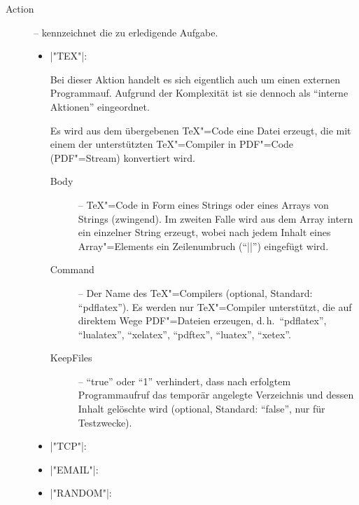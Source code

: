 \documentclass[%
fontsize=11pt
,paper=a4
,twoside
,headings=normal
,numbers=endperiod
,pagesize
]{scrartcl}
\begin{document}
 \begin{description}

  \item[Action] -- kennzeichnet die zu erledigende Aufgabe.

  \begin{itemize}

    \item |"TEX"|: \par

      Bei dieser Aktion handelt es sich eigentlich auch um einen externen
      Programmauf. Aufgrund der Komplexität ist sie dennoch als "`interne
      Aktionen"' eingeordnet.

      Es wird aus dem übergebenen \TeX"=Code eine Datei erzeugt, die mit
      einem der unterstützten \TeX"=Compiler in PDF"=Code (PDF"=Stream)
      konvertiert wird.

      \begin{description}

        \item[Body] -- \TeX"=Code in Form eines Strings oder eines Arrays von
        Strings (zwingend). Im zweiten Falle wird aus dem Array intern ein
        einzelner String erzeugt, wobei nach jedem Inhalt eines
        Array"=Elements ein Zeilenumbruch ("`|\n|"') eingefügt wird.

        \item[Command] -- Der Name des \TeX"=Compilers (optional, Standard:
        "`pdflatex"'). Es werden nur \TeX"=Compiler unterstützt, die auf
        direktem Wege PDF"=Dateien erzeugen, d.\,h.\ "`pdflatex"',
        "`lualatex"', "`xelatex"', "`pdftex"', "`luatex"', "`xetex"'.

        \item[KeepFiles] -- "`true"' oder "`1"' verhindert, dass nach
        erfolgtem Programmaufruf das temporär angelegte Verzeichnis und
        dessen Inhalt gelöschte wird (optional, Standard: "`false"', nur für
        Testzwecke).

      \end{description}

    \item |"TCP"|: \par

    \item |"EMAIL"|: \par

    \item |"RANDOM"|: \par


\end{itemize}
\end{description}
\end{document}
